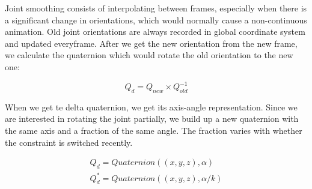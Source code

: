 Joint smoothing consists of interpolating between frames, especially when there is a significant change in orientations, which would normally cause a non-continuous animation. 
Old joint orientations are always recorded in global coordinate system and updated everyframe. After we get the new orientation from the new frame, we calculate the quaternion
which would rotate the old orientation to the new one:

\begin{equation}
Q_{d} = Q_{new} \times Q_{old}^{-1}
\label{eqn:rotator_quaternion}
\end{equation} 

When we get te delta quaternion, we get its axis-angle representation. Since we are interested in rotating the joint partially, we build up a new quaternion with the same axis and 
a fraction of the same angle. The fraction varies with whether the constraint is switched recently. 

\begin{equation} 
\begin{split}
Q_{d} = Quaternion((x,y,z),\alpha) \\  
Q_d^* = Quaternion((x,y,z), \alpha / k )
\label{eqn:partial_rotator}
\end{split}
\end{equation} 
